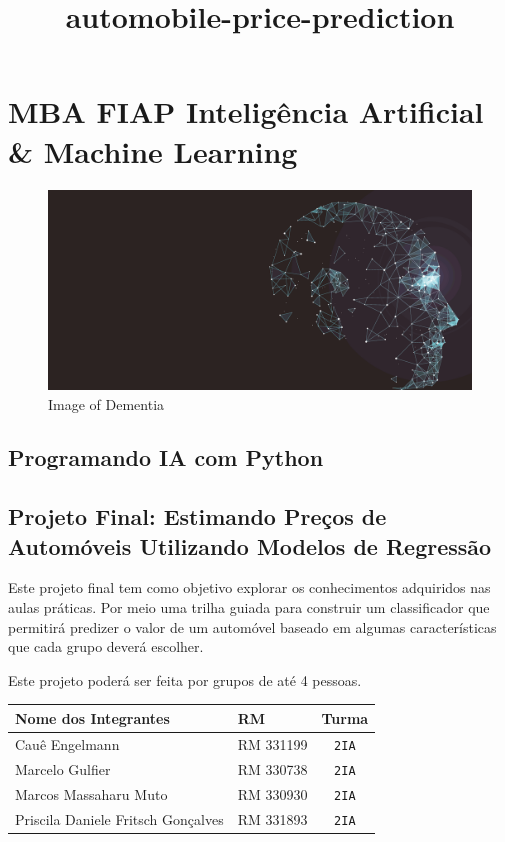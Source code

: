\documentclass[11pt]{article}
\title{automobile-price-prediction}
\makeatletter
\def\maxwidth{\ifdim\Gin@nat@width>\linewidth\linewidth
    \else\Gin@nat@width\fi}
\let\Oldincludegraphics\includegraphics
\renewcommand{\includegraphics}[1]{\Oldincludegraphics[width=.8\maxwidth]{#1}}
\makeatother
\begin{document}
    
    
    \maketitle
    
    

    
    \section{MBA FIAP Inteligência Artificial \& Machine
Learning}\label{mba-fiap-inteliguxeancia-artificial-machine-learning}

\begin{figure}
\centering
\includegraphics{img/ml.png}
\caption{Image of Dementia}
\end{figure}

\subsection{Programando IA com Python}\label{programando-ia-com-python}

\subsection{Projeto Final: Estimando Preços de Automóveis Utilizando
Modelos de
Regressão}\label{projeto-final-estimando-preuxe7os-de-automuxf3veis-utilizando-modelos-de-regressuxe3o}

Este projeto final tem como objetivo explorar os conhecimentos
adquiridos nas aulas práticas. Por meio uma trilha guiada para construir
um classificador que permitirá predizer o valor de um automóvel baseado
em algumas características que cada grupo deverá escolher.

Este projeto poderá ser feita por grupos de até 4 pessoas.

\begin{longtable}[]{@{}llc@{}}
\toprule
Nome dos Integrantes & RM & Turma\tabularnewline
\midrule
\endhead
Cauê Engelmann & RM 331199 & \texttt{2IA}\tabularnewline
Marcelo Gulfier & RM 330738 & \texttt{2IA}\tabularnewline
Marcos Massaharu Muto & RM 330930 & \texttt{2IA}\tabularnewline
Priscila Daniele Fritsch Gonçalves & RM 331893 &
\texttt{2IA}\tabularnewline
\bottomrule
\end{longtable}
\end{document}
